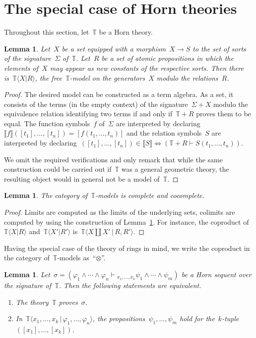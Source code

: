 \documentclass[oneside,reqno]{amsart}
\theoremstyle{definition}
\theoremstyle{plain}
\newtheorem{lemma}[defn]{Lemma}
\theoremstyle{remark}
\newcommand{\TT}{\mathbb{T}}
\renewcommand{\_}{\mathpunct{.}\,}
\newcommand{\?}{\,{:}\,}
\newcommand{\brak}[1]{\llbracket #1 \rrbracket}
\newcommand{\seq}[1]{\mathrel{\vdash\!\!\!_{#1}}}
\begin{document}
\section{The special case of Horn theories}
\label{sect:horn}

Throughout this section, let~$\TT$ be a Horn theory.

\begin{lemma}\label{lemma:free-models}
Let~$X$ be a set equipped with a morphism~$X \to S$ to the set of sorts
of the signature~$\Sigma$ of~$\TT$. Let~$R$ be a set of atomic propositions in which the
elements of~$X$ may appear as new constants of the respective sorts. Then there
is~$\TT\langle X | R \rangle$, the free~$\TT$-model on the generators~$X$ modulo
the relations~$R$.\end{lemma}

\begin{proof}The desired model can be constructed as a term algebra. As a set,
it consists of the terms (in the empty context) of the signature~$\Sigma + X$
modulo the equivalence relation identifying two terms if and only if~$\TT + R$
proves them to be equal. The function symbols~$f$ of~$\Sigma$ are interpreted
by declaring~$\brak{f}([t_1],\ldots,[t_n]) = [f(t_1,\ldots,t_n)]$ and the
relation symbols~$S$ are interpreted by declaring~$([t_1],\ldots,[t_n]) \in
\brak{S} \Leftrightarrow (\TT + R \vdash S(t_1,\ldots,t_n))$.

We omit the required verifications and only remark that while the same
construction could be carried out if~$\TT$ was a general geometric theory, the
resulting object would in general not be a model of~$\TT$.
\end{proof}

\begin{lemma}The category of~$\TT$-models is complete and
cocomplete.\end{lemma}

\begin{proof}Limits are computed as the limits of the underlying sets, colimits
are computed by using the construction of Lemma~\ref{lemma:free-models}. For
instance, the coproduct of~$\TT\langle X | R \rangle$ and~$\TT\langle X' | R'
\rangle$ is~$\TT\langle X \amalg X' \,|\, R, R' \rangle$.\end{proof}

Having the special case of the theory of rings in mind, we write the coproduct
in the category of~$\TT$-models as~``$\otimes$''.

\begin{lemma}Let~$\sigma = (\varphi_1 \wedge \cdots \wedge \varphi_n
\seq{x_1,\ldots,x_k} \psi_1 \wedge \cdots \wedge \psi_m)$ be a Horn sequent
over the signature of~$\TT$. Then the following statements are equivalent.
\begin{enumerate}
\item The theory~$\TT$ proves~$\sigma$. \smallskip
\item In~$\TT\langle x_1,\ldots,x_k \,|\, \varphi_1,\ldots,\varphi_n \rangle$, the
propositions~$\psi_1,\ldots,\psi_m$ hold for
the~$k$-tuple~$([x_1],\ldots,[x_k])$.
\end{enumerate}
\end{lemma}
\end{document}
